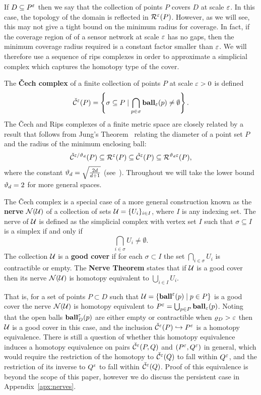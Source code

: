 If $D\subseteq P^\varepsilon$ then we say that the collection of points $P$ covers $D$ at scale $\varepsilon$.
In this case, the topology of the domain is reflected in $\mathcal{R}^\varepsilon(P)$.
However, as we will see, this may not give a tight bound on the minimum radius for coverage.
In fact, if the coverage region of of a sensor network at scale $\varepsilon$ has no gaps, then the minimum coverage radius required is a constant factor smaller than $\varepsilon$.
We will therefore use a sequence of rips complexes in order to approximate a simplicial complex which captures the homotopy type of the cover.

The \textbf{\v Cech complex} of a finite collection of points $P$ at scale $\varepsilon > 0$ is defined
\[ \check{\mathcal{C}}^\varepsilon(P) = \left\{\sigma \subseteq P\mid \bigcap_{p\in \sigma}\mathbf{ball}_\varepsilon(p)\neq \emptyset \right\}. \]
The \v Cech and Rips complexes of a finite metric space are closely related by a result that follows from Jung's Theorem~\cite{jung01uber} relating the diameter of a point set $P$ and the radius of the minimum enclosing ball:
\[\check{\mathcal{C}}^{\varepsilon/\vartheta_d}(P)\subseteq\mathcal{R}^\varepsilon(P)\subseteq\check{\mathcal{C}}^\varepsilon(P)\subseteq\mathcal{R}^{\vartheta_d\varepsilon}(P),\]
where the constant $\vartheta_d = \sqrt{\frac{2d}{d+1}}$ (see~\cite{buchet15efficient}).
Throughout we will take the lower bound $\vartheta_d = 2$ for more general spaces.

The \v Cech complex is a special case of a more general construction known as the \textbf{nerve} $\mathcal{N}(\mathcal{U})$ of a collection of sets $\mathcal{U} = \{U_i\}_{i\in I}$, where $I$ is any indexing set.
The nerve of $\mathcal{U}$ is defined as the simplicial complex with vertex set $I$ such that $\sigma\subseteq I$ is a simplex if and only if
\[
  \bigcap_{i\in \sigma} U_i\neq \emptyset.
\]
The collection $\mathcal{U}$ is a \textbf{good cover} if for each $\sigma\subset I$ the set $\bigcap_{i\in\sigma} U_i$ is contractible or empty.
The \textbf{Nerve Theorem} states that if $\mathcal{U}$ is a good cover then its nerve $\mathcal{N}(\mathcal{U})$ is homotopy equivalent to $\bigcup_{i\in I} U_i$.

That is, for a set of points $P\subset D$ such that $\mathcal{U} = \{\mathbf{ball}^\varepsilon(p)\mid p\in P\}$ is a good cover the nerve $\mathcal{N}(\mathcal{U})$ is homotopy equivalent to $P^\varepsilon = \bigcup_{p\in P} \mathbf{ball}_\varepsilon(p)$.
Noting that the open balls $\mathbf{ball}^\varepsilon_D(p)$ are either empty or contractible when $\varrho_D > \varepsilon$ then $\mathcal{U}$ is a good cover in this case, and the inclusion $\check{\mathcal{C}}^\varepsilon(P)\hookrightarrow P^\varepsilon$ is a homotopy equivalence.
There is still a question of whether this homotopy equivalence induces a homotopy equivalence on pairs $\check{\mathcal{C}}^\varepsilon(P,Q)$ and $(P^\varepsilon, Q^\varepsilon)$ in general, which would require the restriction of the homotopy to $\check{\mathcal{C}}^\varepsilon(Q)$ to fall within $Q^\varepsilon$, and the restriction of its inverse to $Q^\varepsilon$ to fall within $\check{\mathcal{C}}^\varepsilon(Q)$.
Proof of this equivalence is beyond the scope of this paper, however we do discuss the persistent case in Appendix~\ref{apx:nerves}.
